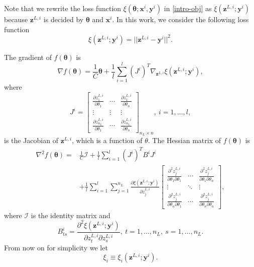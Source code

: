 \documentclass[12pt]{article}
\def\bx{{\boldsymbol x}}
\def\by{{\boldsymbol y}}
\def\bz{{\boldsymbol z}}
\def\btheta{\boldsymbol \theta}
\begin{document}
Note that we rewrite the loss function $\xi(\btheta;\bx^i,\by^i)$ in \eqref{intro-obj} as $\xi(\bz^{L,i};\by^i)$ because $\bz^{L,i}$
is decided by $\btheta$ and $\bx^i$.
In this work, we consider the following loss function
\begin{equation}
\label{thiswork-loss}
    \xi(\bz^{L,i};\by^i) = || \bz^{L,i} - \by^i ||^2.
\end{equation}
\par The gradient of $f(\btheta)$ is
\begin{equation}
\label{whole-gradient}
	\nabla f(\btheta) =  \frac{1}{C}{\btheta} + \frac{1}{l} \sum_{i=1}^l (J^i)^T \nabla_{\bz^{L,i}} \xi(\bz^{L,i};\by^i),
\end{equation}
where
\begin{equation}
\label{jacobian}
J^i =
\begin{bmatrix}
\frac{\partial z_1^{L,i}}{\partial \theta_1} & \cdots & \frac{\partial z_1^{L,i}}{\partial \theta_n} \\
\vdots & \vdots & \vdots\\
\frac{\partial z_{n_L}^{L,i}}{\partial \theta_1} & \cdots & \frac{\partial z_{n_L}^{L,i}}{\partial \theta_n}
\end{bmatrix}_{n_{L} \times n },\ i=1,\ldots,l, 
\end{equation}
is the Jacobian of $\bz^{L,i}$, which is a function of $\theta$.
The Hessian matrix of $f(\btheta)$ is
\begin{align}
\label{hessiantogauss}
\nabla^2 f(\btheta) =&  \frac{1}{C} \mathcal I + \frac{1}{l} \sum_{i=1}^l 
(J^i)^T B^{i}J^i
\nonumber\\
&+\frac{1}{l} \sum_{i=1}^l\sum_{j=1}^{n_L} \frac{\partial \xi(\bz^{L,i};\by^i)}{\partial z_j^{L,i}}
\begin{bmatrix}
\frac{\partial^2 z_j^{L,i}}{\partial \theta_1 \partial \theta_1} & \cdots & \frac{\partial^2 z_j^{L,i}}{\partial \theta_1 \partial \theta_n}\\
\vdots & \ddots & \vdots\\
\frac{\partial^2 z_j^{L,i}}{\partial \theta_n \partial \theta_1} & \cdots & \frac{\partial^2 z_j^{L,i}}{\partial \theta_n \partial \theta_n}
\end{bmatrix},
\end{align}
where $\mathcal I$ is the identity matrix and
\begin{equation}
	B^{i}_{ts} = \frac{\partial^2 \xi(\bz^{L,i};\by^i)}{\partial z_t^{L,i} \partial z_s^{L,i}},\ t=1,\ldots,n_L,\ s=1,\ldots,n_L.
\label{Bts}
\end{equation}
From now on for simplicity we let
\begin{equation*}
\xi_i \equiv \xi_i(\bz^{L,i};\by^i).
\end{equation*}
\end{document}

